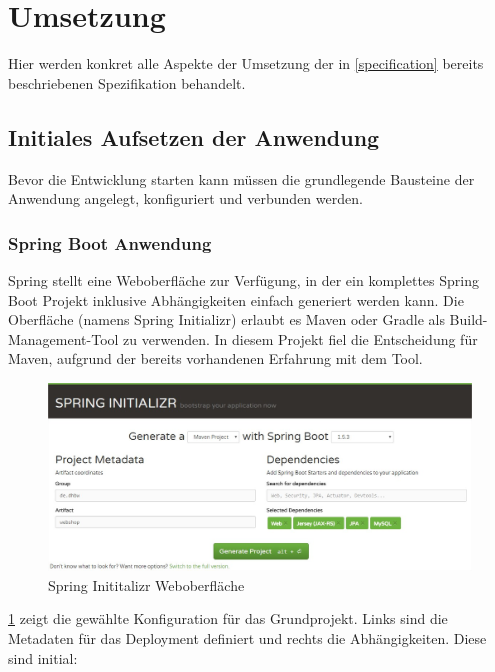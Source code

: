 \cleardoublepage
\section{Umsetzung} \thispagestyle{nomarkstyle}
Hier werden konkret alle Aspekte der Umsetzung der in \cref{specification} bereits beschriebenen Spezifikation behandelt. %
 
\subsection{Initiales Aufsetzen der Anwendung}
Bevor die Entwicklung starten kann müssen die grundlegende Bausteine der Anwendung angelegt, konfiguriert und verbunden werden. 

\subsubsection{Spring Boot Anwendung}\label{spring-boot-init}
Spring stellt eine Weboberfläche zur Verfügung, in der ein komplettes Spring Boot Projekt inklusive Abhängigkeiten einfach generiert werden kann. Die Oberfläche (namens Spring Initializr) erlaubt es Maven oder Gradle als Build-Management-Tool zu verwenden. In diesem Projekt fiel die Entscheidung für Maven, aufgrund der bereits vorhandenen Erfahrung mit dem Tool. 

\begin{figure}[th!]
	\centering
	\includegraphics[width=\linewidth]{bilder/kap7/Spring-Initializr}
	\caption{Spring Inititalizr Weboberfläche}
	\label{fig:spring-initializr}
\end{figure}

\cref{fig:spring-initializr} zeigt die gewählte Konfiguration für das Grundprojekt. Links sind die Metadaten für das Deployment definiert und rechts die Abhängigkeiten. Diese sind initial:


